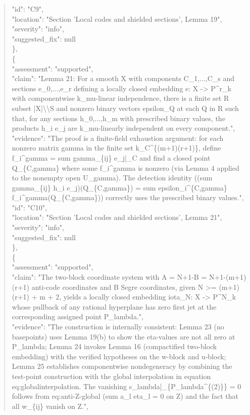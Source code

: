 \documentclass[11pt]{article}
\begin{document}
\begin{quote}
      "id": "C9",\\
      "location": "Section 'Local codes and shielded sections', Lemma 19",\\
      "severity": "info",\\
      "suggested\_fix": null\\
    \},\\
    \{\\
      "assessment": "supported",\\
      "claim": "Lemma 21: For a smooth X with components C\_1,...,C\_s and sections e\_0,...,e\_r defining a locally closed embedding e: X -> P\^{}r\_k with componentwise k\_mu-linear independence, there is a finite set R subset |X|\textbackslash{}\textbackslash{}S and nonzero binary vectors epsilon\_Q at each Q in R such that, for any sections h\_0,...,h\_m with prescribed binary values, the products h\_i e\_j are k\_mu-linearly independent on every component.",\\
      "evidence": "The proof is a finite-field exhaustion argument: for each nonzero matrix gamma in the finite set k\_C\^{}\{(m+1)(r+1)\}, define f\_i\^{}gamma = sum gamma\_\{ij\} e\_j|\_C and find a closed point Q\_\{C,gamma\} where some f\_i\^{}gamma is nonzero (via Lemma 4 applied to the nonempty open U\_gamma). The detection identity ((sum gamma\_\{ij\} h\_i e\_j)(Q\_\{C,gamma\}) = sum epsilon\_i\^{}\{C,gamma\} f\_i\^{}gamma(Q\_\{C,gamma\})) correctly uses the prescribed binary values.",\\
      "id": "C10",\\
      "location": "Section 'Local codes and shielded sections', Lemma 21",\\
      "severity": "info",\\
      "suggested\_fix": null\\
    \},\\
    \{\\
      "assessment": "supported",\\
      "claim": "The two-block coordinate system with A = N+1-B = N+1-(m+1)(r+1) anti-code coordinates and B Segre coordinates, given N >= (m+1)(r+1) + m + 2, yields a locally closed embedding iota\_N: X -> P\^{}N\_k whose pullback of any rational hyperplane has zero first jet at the corresponding assigned point P\_lambda.",\\
      "evidence": "The construction is internally consistent: Lemma 23 (no basepoints) uses Lemma 19(b) to show the eta-values are not all zero at P\_lambda; Lemma 24 invokes Lemma 16 (compactified two-block embedding) with the verified hypotheses on the w-block and u-block; Lemma 25 establishes componentwise nondegeneracy by combining the test-point construction with the global interpolation in equation eq:globalinterpolation. The vanishing s\_lambda|\_\{P\_lambda\^{}\{(2)\}\} = 0 follows from eq:anti-Z-global (sum a\_l eta\_l = 0 on Z) and the fact that all w\_\{ij\} vanish on Z.",\\

\end{quote}
\end{document}
